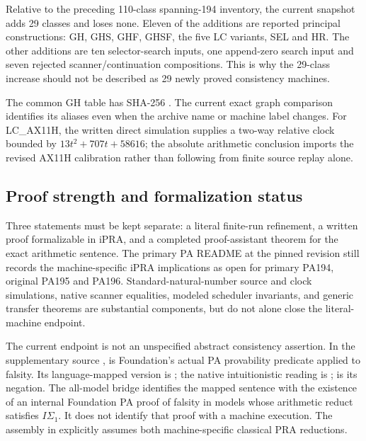 Relative to the preceding 110-class spanning-194 inventory, the current
snapshot adds 29 classes and loses none. Eleven of the additions are reported
principal constructions: GH, GHS, GHF, GHSF, the five LC variants, SEL and HR.
The other additions are ten selector-search inputs, one append-zero search
input and seven rejected scanner/continuation compositions. This is why the
29-class increase should not be described as 29 newly proved consistency
machines.

The common GH table has SHA-256
.
The current exact graph comparison identifies its aliases even when the
archive name or machine label changes. For LC\_AX11H, the written direct
simulation supplies a two-way relative clock bounded by
$13t^2+707t+58616$; the absolute arithmetic conclusion imports the revised
AX11H calibration rather than following from finite source replay alone.

\subsection{Proof strength and formalization status}

Three statements must be kept separate: a literal finite-run refinement, a
written proof formalizable in iPRA, and a completed proof-assistant theorem
for the exact arithmetic sentence. The primary PA README at the pinned
revision still records the machine-specific iPRA implications as open for
primary PA194, original PA195 and PA196. Standard-natural-number source and
clock simulations, native scanner equalities, modeled scheduler invariants,
and generic transfer theorems are substantial components, but do not alone
close the literal-machine endpoint.

The current endpoint is not an unspecified abstract consistency assertion.
In the supplementary source
,
 is Foundation's actual PA provability predicate applied
to falsity. Its language-mapped version is ; the
native intuitionistic reading is ;
 is its negation. The all-model bridge
 identifies the mapped sentence
with the existence of an internal Foundation PA proof of falsity in models
whose arithmetic reduct satisfies $I\Sigma_1$. It does not identify that proof
with a machine execution. The assembly in
 explicitly assumes both
machine-specific classical PRA reductions.

